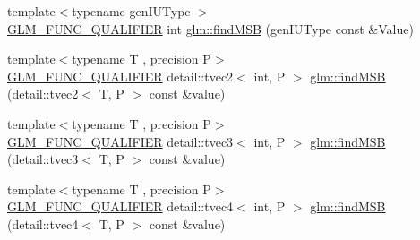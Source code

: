 \begin{DoxyCompactItemize}
\item 
{\footnotesize template$<$typename gen\+I\+U\+Type $>$ }\\\hyperlink{setup_8hpp_a33fdea6f91c5f834105f7415e2a64407}{G\+L\+M\+\_\+\+F\+U\+N\+C\+\_\+\+Q\+U\+A\+L\+I\+F\+I\+ER} int \hyperlink{namespaceglm_adc22c75c7dd35bacf86237d8bfe8b53a}{glm\+::find\+M\+SB} (gen\+I\+U\+Type const \&Value)
\item 
{\footnotesize template$<$typename T , precision P$>$ }\\\hyperlink{setup_8hpp_a33fdea6f91c5f834105f7415e2a64407}{G\+L\+M\+\_\+\+F\+U\+N\+C\+\_\+\+Q\+U\+A\+L\+I\+F\+I\+ER} detail\+::tvec2$<$ int, P $>$ \hyperlink{namespaceglm_af4a84b6df7edb51f4b6a612021ef7999}{glm\+::find\+M\+SB} (detail\+::tvec2$<$ T, P $>$ const \&value)
\item 
{\footnotesize template$<$typename T , precision P$>$ }\\\hyperlink{setup_8hpp_a33fdea6f91c5f834105f7415e2a64407}{G\+L\+M\+\_\+\+F\+U\+N\+C\+\_\+\+Q\+U\+A\+L\+I\+F\+I\+ER} detail\+::tvec3$<$ int, P $>$ \hyperlink{namespaceglm_a9d435c4aca98a82adffb2a49a38d0019}{glm\+::find\+M\+SB} (detail\+::tvec3$<$ T, P $>$ const \&value)
\item 
{\footnotesize template$<$typename T , precision P$>$ }\\\hyperlink{setup_8hpp_a33fdea6f91c5f834105f7415e2a64407}{G\+L\+M\+\_\+\+F\+U\+N\+C\+\_\+\+Q\+U\+A\+L\+I\+F\+I\+ER} detail\+::tvec4$<$ int, P $>$ \hyperlink{namespaceglm_a91e6dfc9a29f78870ea1e8918dd90072}{glm\+::find\+M\+SB} (detail\+::tvec4$<$ T, P $>$ const \&value)
\end{DoxyCompactItemize}
